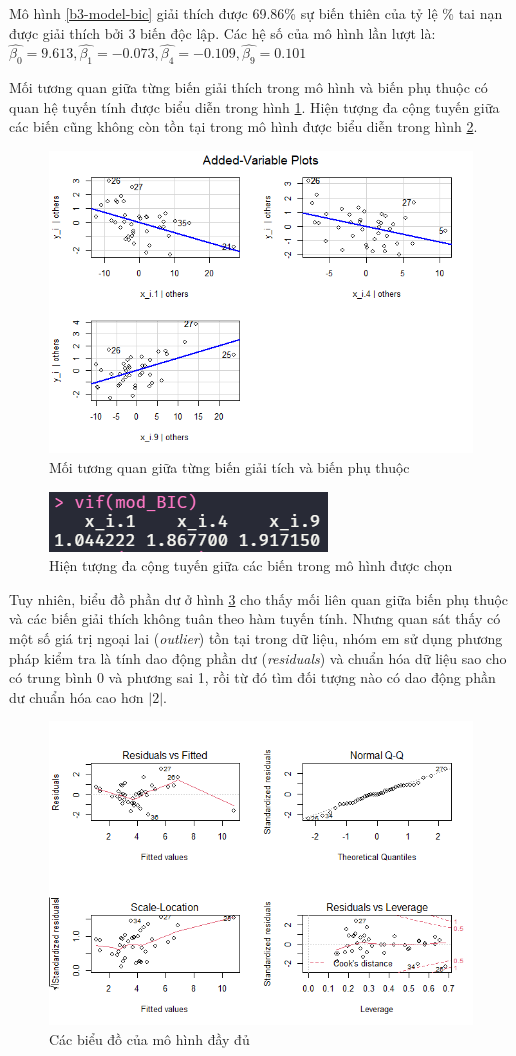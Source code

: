 Mô hình \ref{b3-model-bic} giải thích được 69.86\% sự biến thiên của tỷ lệ \% tai nạn được giải thích bởi 3 biến độc lập. Các hệ số của mô hình lần lượt là: $\hat{\beta_0}=9.613, \hat{\beta_1}=-0.073, \hat{\beta_4}=-0.109, \hat{\beta_9}=0.101$

Mối tương quan giữa từng biến giải thích trong mô hình và biến phụ thuộc có quan hệ tuyến tính được biểu diễn trong hình \ref{fig-b3:model-bic-vars}. Hiện tượng đa cộng tuyến giữa các biến cũng không còn tồn tại trong mô hình được biểu diễn trong hình \ref{fig-b3:model-bic-vif}.
\begin{figure}[H]
	\centering
	\includegraphics[width=0.65\linewidth]{images/B3/model-bic-vars}
	\caption{Mối tương quan giữa từng biến giải tích và biến phụ thuộc}
	\label{fig-b3:model-bic-vars}
\end{figure}

\begin{figure}[H]
	\centering
	\includegraphics[width=0.35\linewidth]{images/B3/model-bic-vif}
	\caption{Hiện tượng đa cộng tuyến giữa các biến trong mô hình được chọn}
	\label{fig-b3:model-bic-vif}
\end{figure}


Tuy nhiên, biểu đồ phần dư ở hình \ref{fig-b3:model-full-plot} cho thấy mối liên quan giữa biến phụ thuộc và các biến giải thích không tuân theo hàm tuyến tính. Nhưng quan sát thấy có một số giá trị ngoại lai (\textit{outlier}) tồn tại trong dữ liệu, nhóm em sử dụng phương pháp kiểm tra là tính dao động phần dư (\textit{residuals}) và chuẩn hóa dữ liệu sao cho có trung bình 0 và phương sai 1, rồi từ đó tìm đối tượng nào có dao động phần dư chuẩn hóa cao hơn $|2|$. 
\begin{figure}[H]
	\centering
	\includegraphics[width=0.65\linewidth]{images/B3/model-full-plot}
	\caption{Các biểu đồ của mô hình đầy đủ}
	\label{fig-b3:model-full-plot}
\end{figure}

